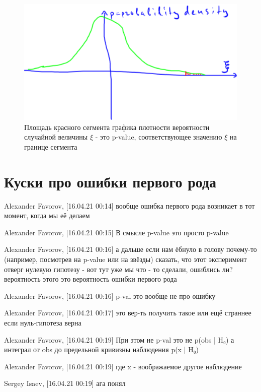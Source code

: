 \documentclass{book}
\begin{document}
\begin{figure}
    \centering
    \includegraphics[scale=.5]{img/p-value.png}
    \caption{Площадь красного сегмента графика плотности вероятности случайной величины $\xi$ - это p-value, соответствующее значению $\xi$ на границе сегмента}
    \label{pval}
\end{figure}




\section*{Куски про ошибки первого рода}


Alexander Favorov, [16.04.21 00:14]
вообще ошибка первого рода возникает в тот момент, когда мы её делаем

Alexander Favorov, [16.04.21 00:15]
В смысле p-value это просто p-value

Alexander Favorov, [16.04.21 00:16]
а дальше если нам ёбнуло в голову почему-то (например, посмотрев на p-value или на звёзды) сказать, что этот эксперимент отверг нулевую гипотезу - вот тут уже мы что - то сделали, ошиблись ли? вероятность этого это вероятность ошибки первого рода

Alexander Favorov, [16.04.21 00:16]
p-val это вообще не про ошибку

Alexander Favorov, [16.04.21 00:17]
это вер-ть получить такое или ещё страннее если нуль-гипотеза верна

Alexander Favorov, [16.04.21 00:19]
При этом не p-val это не  p(obs | H₀) а интеграл от obs до предельной кривизны наблюдения  p(x | H₀)

Alexander Favorov, [16.04.21 00:19]
где x - воображаемое другое наблюдение

Sergey Isaev, [16.04.21 00:19]
ага понял
\end{document}
